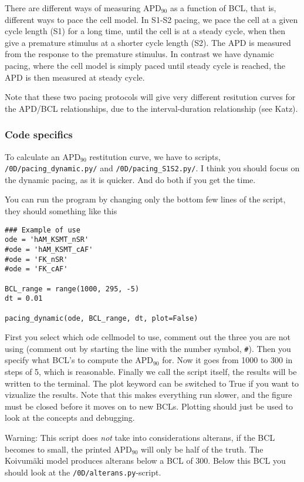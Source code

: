 \documentclass[a4paper, 11pt, notitlepage, english]{article}
\begin{document}
There are different ways of measuring APD$_{90}$ as a function of BCL, that is, different ways to pace the cell model. In S1-S2 pacing, we pace the cell at a given cycle length (S1) for a long time, until the cell is at a steady cycle, when then give a premature stimulus at a shorter cycle length (S2). The APD is measured from the response to the premature stimulus. In contrast we have dynamic pacing, where the cell model is simply paced until steady cycle is reached, the APD is then measured at steady cycle. 

Note that these two pacing protocols will give very different resitution curves for the APD/BCL relationships, due to the interval-duration relationship (see Katz).

\subsubsection*{Code specifics}

To calculate an APD$_90$ restitution curve, we have to scripts, \verb+/0D/pacing_dynamic.py/+ and \verb+/0D/pacing_S1S2.py/+. I think you should focus on the dynamic pacing, as it is quicker. And do both if you get the time. 

You can run the program by changing only the bottom few lines of the script, they should something like this
\begin{lstlisting}
### Example of use 
ode = 'hAM_KSMT_nSR'
#ode = 'hAM_KSMT_cAF'
#ode = 'FK_nSR'
#ode = 'FK_cAF'

BCL_range = range(1000, 295, -5)
dt = 0.01

pacing_dynamic(ode, BCL_range, dt, plot=False)
\end{lstlisting}

First you select which ode cellmodel to use, comment out the three you are not using (comment out by starting the line with the number symbol, \verb+#+). Then you specify what BCL's to compute the APD$_{90}$ for. Now it goes from 1000 to 300 in steps of 5, which is reasonable. Finally we call the script itself, the results will be written to the terminal. The plot keyword can be switched to True if you want to vizualize the results. Note that this makes everything run slower, and the figure must be closed before it moves on to new BCLs. Plotting should just be used to look at the concepts and debugging.

Warning: This script does \emph{not} take into considerations alterans, if the BCL becomes to small, the printed APD$_{90}$ will only be half of the truth. The Koivumäki model produces alterans below a BCL of 300. Below this BCL you should look at the \verb+/0D/alterans.py+-script.
\end{document}
